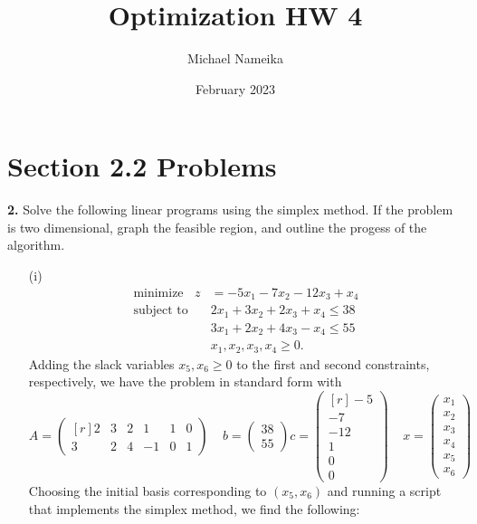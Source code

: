 \documentclass{article}
\title{Optimization HW 4}
\author{Michael Nameika}
\date{February 2023}
\begin{document}
\maketitle

\section*{Section 2.2 Problems}
\textbf{2.} Solve the following linear programs using the simplex method. If the problem is two dimensional, graph the feasible region, and outline the progess of the algorithm.
\begin{itemize}
    \item[(i)] 
    \begin{align*}
        \text{minimize} \:\:\:\: z &= -5x_1 - 7x_2 - 12x_3 + x_4 \\
        \text{subject to} \:\:\:\: &2x_1 + 3x_2 + 2x_3 + x_4 \leq 38\\
        &3x_1 + 2x_2 + 4x_3 - x_4 \leq 55\\
        &x_1,x_2,x_3,x_4 \geq 0.
    \end{align*}
    Adding the slack variables $x_5,x_6 \geq 0$ to the first and second constraints, respectively, we have the problem in standard form with
    \[A = \begin{pmatrix*}[r]
        2 & 3 & 2 & 1 & 1 & 0\\
        3 & 2 & 4 & -1 & 0 & 1
    \end{pmatrix*} \:\:\:\:\: b = \begin{pmatrix}
        38\\
        55
    \end{pmatrix} c = \begin{pmatrix*}[r]
        -5\\
        -7\\
        -12\\
        1\\
        0\\
        0
    \end{pmatrix*}\:\:\:\:\: x = \begin{pmatrix}
        x_1\\
        x_2\\
        x_3\\
        x_4\\
        x_5\\
        x_6
    \end{pmatrix}
    \]
    Choosing the initial basis corresponding to $(x_5,x_6)$ and running a script that implements the simplex method, we find the following:

\end{itemize}
\end{document}
